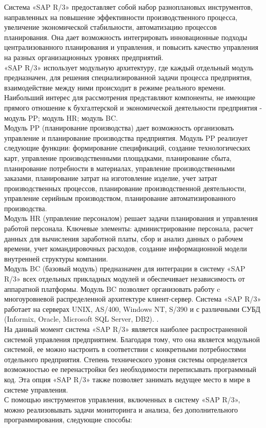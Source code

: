 \indent Система «SAP R/3» предоставляет собой набор разноплановых инструментов, направленных на повышение эффективности производственного процесса, увеличение экономической стабильности, автоматизацию процессов планирования.
Она дает возможность интегрировать инновационные подходы централизованного планирования и управления, и повысить качество управления на разных организационных уровнях предприятий.\\
\indent «SAP R/3» использует модульную архитектуру, где каждый отдельный модуль предназначен, для решения специализированной задачи процесса предприятия, взаимодействие между ними происходит в режиме реального времени. 
Наибольший интерес для рассмотрения представляют компоненты, не имеющие прямого отношение к бухгалтерской и экономической деятельности предприятия - модуль PP; модуль HR; модуль BC.\\
\indent Модуль PP (планирование производства) дает возможность организовать управление и планирование производства предприятия.
Модуль PP реализует следующие функции: формирование спецификаций, создание технологических карт, управление производственными площадками, планирование сбыта, планирование потребности в материалах, управление производственными заказами, планирование затрат на изготовление изделие, учет затрат производственных процессов, планирование производственной деятельности, управление серийным производством, планирование автоматизированного производства.\\
\indent Модуль HR (управление персоналом) решает задачи планирования и управления работой персонала. 
Ключевые элементы: администрирование персонала, расчет данных для вычисления заработной платы, сбор и анализ данных о рабочем времени, учет командировочных расходов, создание информационной модели внутренней структуры компании.\\
\indent Модуль BC (базовый модуль) предназначен для интеграции в систему «SAP R/3» всех отдельных прикладных модулей и обеспечивает независимость от аппаратной платформы. 
Модуль BC позволяет организовать работу c многоуровневой распределенной архитектуре клиент-сервер. 
Система «SAP R/3» работает на серверах UNIX, AS/400, Windows NT, S/390 и с различными СУБД (Informix, Oracle, Microsoft SQL Server, DB2). \cite{mazBook}.\\
\indent На данный момент система «SAP R/3» является наиболее распространенной системой управления предприятием. 
Благодаря тому, что она является модульной системой, ее можно настроить в соответствии с конкретными потребностями отдельного предприятия. 
Степень технического уровня системы определяется возможностью ее перенастройки без необходимости переписывать программный код. 
Эта опция «SAP R/3» также позволяет занимать ведущее место в мире в системе управления.\\
\indent С помощью инструментов управления, включенных в систему «SAP R/3», можно реализовывать задачи мониторинга и анализа, без дополнительного программирования, следующие способы:

